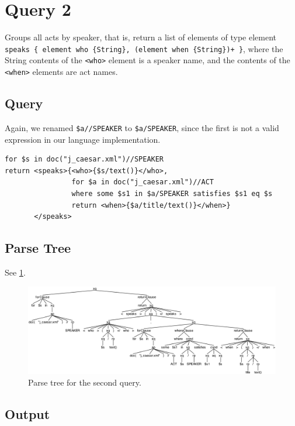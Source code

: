\documentclass{article}
\begin{document}
\section{Query 2}
Groups all acts by speaker, that is, return a list of elements of type element  \texttt{speaks \{ element who \{String\}, (element when \{String\})+ \}}, where the String contents of the \texttt{<who>} element is a speaker name, and the contents of the \texttt{<when>} elements are act names.

\subsection{Query}
Again, we renamed \texttt{\$a//SPEAKER} to \texttt{\$a/SPEAKER}, since the first is not a  valid expression in our language implementation.
\begin{verbatim}
for $s in doc("j_caesar.xml")//SPEAKER
return <speaks>{<who>{$s/text()}</who>,
                for $a in doc("j_caesar.xml")//ACT
                where some $s1 in $a/SPEAKER satisfies $s1 eq $s
                return <when>{$a/title/text()}</when>}
       </speaks>
\end{verbatim}

\subsection{Parse Tree}
See \cref{fig:parseTree2}.
\begin{figure}[htpb]
  \centering
  \includegraphics[width=\linewidth]{imgs/antlr4_parse_tree_query_2.png}
  \caption{Parse tree for the second query.}\label{fig:parseTree2}
\end{figure}

\subsection{Output}
\end{document}
